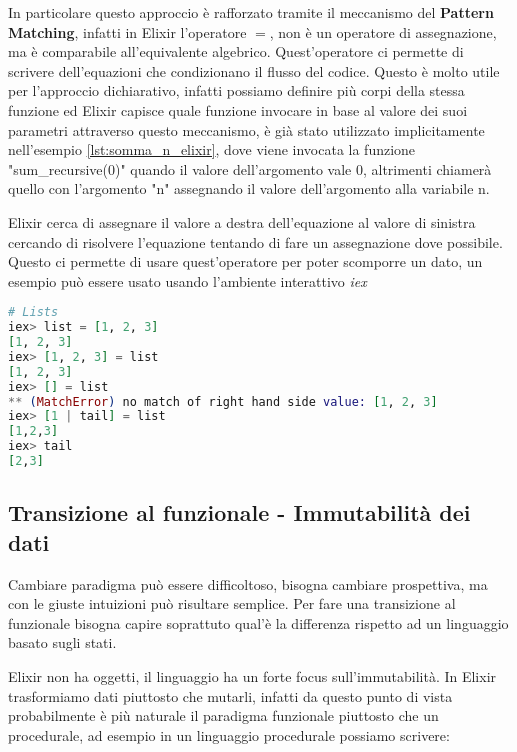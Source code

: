In particolare questo approccio è rafforzato tramite il meccanismo
del \textbf{Pattern Matching}, infatti in Elixir l'operatore $=$,
non è un operatore di assegnazione, ma è comparabile
all'equivalente algebrico.
Quest'operatore ci permette di scrivere dell'equazioni
che condizionano il flusso del codice.
Questo è molto utile per l'approccio
dichiarativo, infatti possiamo definire più corpi della stessa funzione
ed Elixir capisce quale funzione invocare in base
al valore dei suoi parametri attraverso questo meccanismo,
è già stato utilizzato implicitamente nell'esempio \ref{lst:somma_n_elixir},
dove viene invocata la funzione "sum\_recursive(0)" quando
il valore dell'argomento vale 0, altrimenti chiamerà quello
con l'argomento "n" assegnando il valore dell'argomento alla variabile n.

Elixir cerca di assegnare il valore a destra dell'equazione
al valore di sinistra cercando di risolvere l'equazione tentando
di fare un assegnazione dove possibile.
Questo ci permette di usare quest'operatore per poter
scomporre un dato, un esempio può essere usato usando l'ambiente
interattivo \textit{iex}

\begin{lstlisting}[language=elixir, caption={Pattern Matching},captionpos=b,
	label={lst:pattern_matching}]
# Lists
iex> list = [1, 2, 3]
[1, 2, 3]
iex> [1, 2, 3] = list
[1, 2, 3]
iex> [] = list
** (MatchError) no match of right hand side value: [1, 2, 3]
iex> [1 | tail] = list
[1,2,3]
iex> tail
[2,3]
\end{lstlisting}


\subsection{Transizione al funzionale - Immutabilità dei dati}

Cambiare paradigma può essere difficoltoso, bisogna
cambiare prospettiva, ma con le giuste intuizioni
può risultare semplice. Per fare una transizione al funzionale
bisogna capire soprattuto qual'è la differenza rispetto ad un
linguaggio basato sugli stati.

Elixir non ha oggetti, il linguaggio ha un forte focus sull'immutabilità.
In Elixir trasformiamo dati piuttosto che mutarli, infatti da questo
punto di vista probabilmente è più naturale il paradigma funzionale
piuttosto che un procedurale, ad esempio in un linguaggio
procedurale possiamo scrivere:

